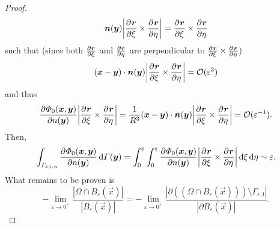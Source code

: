 \documentclass[b5paper, twoside, 11pt]{book}
\begin{document}
\begin{proof}
\begin{equation*}
	 	\vec{n}(\vec{y})\left|\pderiv{\vec{r}}{\xi}\times\pderiv{\vec{r}}{\eta}\right| = \pderiv{\vec{r}}{\xi}\times\pderiv{\vec{r}}{\eta}
	 \end{equation*}
	 such that (since both $\pderiv{\vec{r}}{\xi}$ and $\pderiv{\vec{r}}{\eta}$ are perpendicular to $\pderiv{\vec{r}}{\xi}\times\pderiv{\vec{r}}{\eta}$)
	 \begin{equation*}
	 	(\vec{x}-\vec{y})\cdot \vec{n}(\vec{y})\left|\pderiv{\vec{r}}{\xi}\times\pderiv{\vec{r}}{\eta}\right| = \bigoh(\varepsilon^2)
	 \end{equation*}
	 and thus
	 \begin{equation*}
	 	\pderiv{\Phi_0(\vec{x},\vec{y})}{n(\vec{y})}\left|\pderiv{\vec{r}}{\xi}\times\pderiv{\vec{r}}{\eta}\right| = \frac{1}{R^3}(\vec{x}-\vec{y})\cdot \vec{n}(\vec{y})\left|\pderiv{\vec{r}}{\xi}\times\pderiv{\vec{r}}{\eta}\right| =  \bigoh(\varepsilon^{-1}).
	 \end{equation*}
	 Then,
	 \begin{equation*}
	 	\int_{\Gamma_{\varepsilon,\mathrm{i},n}} \pderiv{\Phi_0(\vec{x},\vec{y})}{n(\vec{y})}\idiff\Gamma(\vec{y}) = \int_0^\varepsilon\int_0^\varepsilon \pderiv{\Phi_0(\vec{x},\vec{y})}{n(\vec{y})}\left|\pderiv{\vec{r}}{\xi}\times\pderiv{\vec{r}}{\eta}\right|\idiff\xi\idiff\eta \sim \varepsilon.
	 \end{equation*}
	 What remains to be proven is
	 \begin{equation*}
	 	-\lim_{\varepsilon\to 0^+}\frac{|\Omega\cap B_\varepsilon(\vec{x})|}{|B_\varepsilon(\vec{x})|} = -\lim_{\varepsilon\to 0^+}\frac{|\partial((\Omega\cap B_\varepsilon(\vec{x})))\setminus\Gamma_{\varepsilon,\mathrm{i}}|}{|\partial B_\varepsilon(\vec{x})|}.
	 \end{equation*}
\end{proof}
\end{document}
